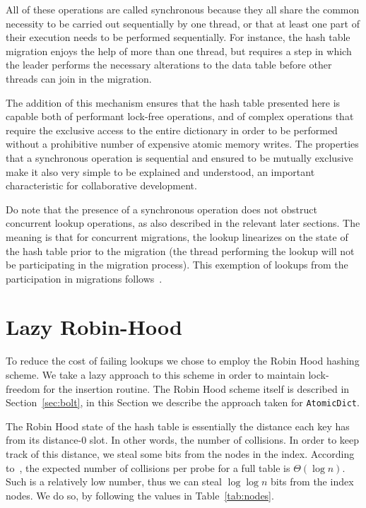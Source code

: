 All of these operations are called synchronous because they all share the common necessity to be carried out sequentially by one thread, or that at least one part of their execution needs to be performed sequentially.
For instance, the hash table migration enjoys the help of more than one thread, but requires a step in which the leader performs the necessary alterations to the data table before other threads can join in the migration.

The addition of this mechanism ensures that the hash table presented here is capable both of performant lock-free operations, and of complex operations that require the exclusive access to the entire dictionary in order to be performed without a prohibitive number of expensive atomic memory writes.
The properties that a synchronous operation is sequential and ensured to be mutually exclusive make it also very simple to be explained and understood, an important characteristic for collaborative development.

Do note that the presence of a synchronous operation does not obstruct concurrent lookup operations, as also described in the relevant later sections.
The meaning is that for concurrent migrations, the lookup linearizes on the state of the hash table prior to the migration (the thread performing the lookup will not be participating in the migration process).
This exemption of lookups from the participation in migrations follows~\cite[\S5.3.2, Preventing Concurrent Updates to Ensure Consistency]{maier}.


\section{Lazy Robin-Hood}\label{sec:lazy-robin-hood}

To reduce the cost of failing lookups we chose to employ the Robin Hood hashing scheme.
We take a lazy approach to this scheme in order to maintain lock-freedom for the insertion routine.
The Robin Hood scheme itself is described in Section~\ref{sec:bolt}, in this Section we describe the approach taken for \texttt{AtomicDict}.

The Robin Hood state of the hash table is essentially the distance each key has from its distance-0 slot.
In other words, the number of collisions.
In order to keep track of this distance, we steal some bits from the nodes in the index.
According to~\cite[Corollary to Theorem~3]{robin-hood}, the expected number of collisions per probe for a full table is $\Theta(\log n)$.
Such is a relatively low number, thus we can steal $\log \log n$ bits from the index nodes.
We do so, by following the values in Table~\ref{tab:nodes}.


